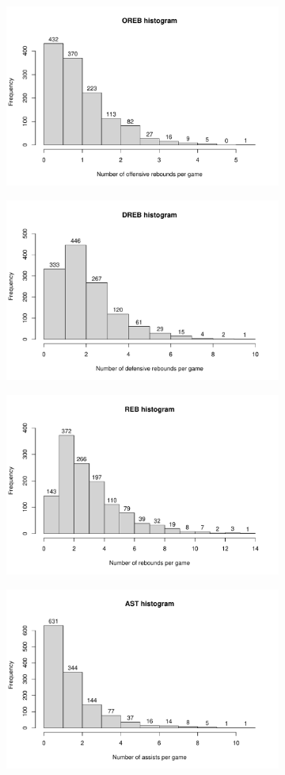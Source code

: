 \begin{figure}[H]
\begin{subfigure}{.3\textwidth}
		\caption{}
		\label{fig:HistFT}
	\end{subfigure}
	\begin{subfigure}{.3\textwidth}
		\centering
		\includegraphics[width=0.5\linewidth]{ImageFiles/Histograms/histogram_oreb.pdf}
		\caption{}
		\label{fig:HistOREB}
	\end{subfigure}%
	\begin{subfigure}{.3\textwidth}
		\centering
		\includegraphics[width=0.5\linewidth]{ImageFiles/Histograms/histogram_dreb.pdf}
		\caption{}
		\label{fig:HistDREB}
	\end{subfigure}%
	\begin{subfigure}{.3\textwidth}
		\centering
		\includegraphics[width=0.5\linewidth]{ImageFiles/Histograms/histogram_reb.pdf}
		\caption{}
		\label{fig:HistREB}
	\end{subfigure}
	\begin{subfigure}{.3\textwidth}
		\centering
		\includegraphics[width=0.5\linewidth]{ImageFiles/Histograms/histogram_ast.pdf}

\end{subfigure}
\end{figure}
